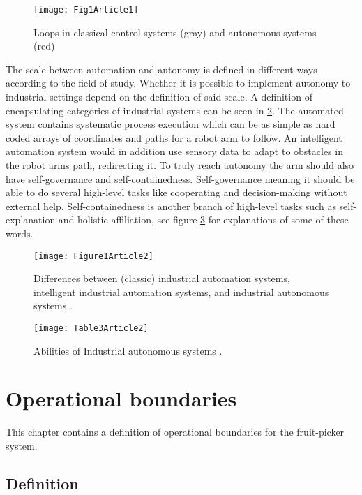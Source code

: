 \documentclass[%
oneside,    %
project,    %
nosummary   %
]{USN-MSc}
\begin{document}
\begin{figure}[!ht]
  \centering
  \texttt{[image: Fig1Article1]}
  \caption{Loops in classical control systems (gray) and autonomous systems (red) \cite{GAMER2019454}}
  \label{fig:Fig1Article1}
\end{figure}

The scale between automation and autonomy is defined in different ways according to the field of study. Whether it is possible to implement autonomy to industrial settings depend on the definition of said scale. A definition of encapsulating categories of industrial systems can be seen in \ref{fig:Fig1Article2}. The automated system contains systematic process execution which can be as simple as hard coded arrays of coordinates and paths for a robot arm to follow. An intelligent automation system would in addition use sensory data to adapt to obstacles in the robot arms path, redirecting it. To truly reach autonomy the arm should also have self-governance and self-containedness. Self-governance meaning it should be able to do several high-level tasks like cooperating and decision-making without external help. Self-containedness is another branch of high-level tasks such as self-explanation and holistic affiliation, see figure \ref{fig:Tab3Article2} for explanations of some of these words. 

\begin{figure}[!ht]
  \centering
  \texttt{[image: Figure1Article2]}
  \caption{Differences between (classic) industrial automation systems, intelligent industrial automation systems, and industrial autonomous systems \cite{Müller}.}
  \label{fig:Fig1Article2}
\end{figure}


\begin{figure}[!ht]
  \centering
  \texttt{[image: Table3Article2]}
  \caption{Abilities of Industrial autonomous systems \cite{Müller}.}
  \label{fig:Tab3Article2}
\end{figure}



\chapter{Operational boundaries}
\label{ch:opBounds}
This chapter contains a definition of operational boundaries for the fruit-picker system.
\section{Definition}
\end{document}
